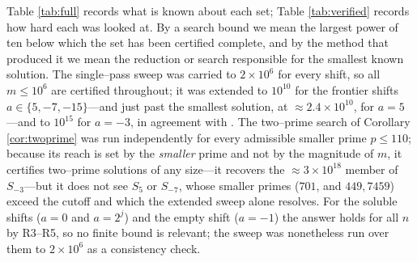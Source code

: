 \documentclass[11pt,reqno]{amsart}
\theoremstyle{plain}
\theoremstyle{definition}
\theoremstyle{remark}
\begin{document}
Table \ref{tab:full} records what is known about each set; Table \ref{tab:verified} records how hard each was looked at. By a search bound we mean the largest power of ten below which the set has been certified complete, and by the method that produced it we mean the reduction or search responsible for the smallest known solution. The single--pass sweep was carried to $2\times10^{6}$ for every shift, so all $m\le10^{6}$ are certified throughout; it was extended to $10^{10}$ for the frontier shifts $a\in\{5,-7,-15\}$---and just past the smallest solution, at $\approx2.4\times10^{10}$, for $a=5$---and to $10^{15}$ for $a=-3$, in agreement with \cite{oeis}. The two--prime search of Corollary \ref{cor:twoprime} was run independently for every admissible smaller prime $p\le110$; because its reach is set by the \emph{smaller} prime and not by the magnitude of $m$, it certifies two--prime solutions of any size---it recovers the $\approx3\times10^{18}$ member of $S_{-3}$---but it does not see $S_5$ or $S_{-7}$, whose smaller primes ($701$, and $449,7459$) exceed the cutoff and which the extended sweep alone resolves. For the soluble shifts ($a=0$ and $a=2^{j}$) and the empty shift ($a=-1$) the answer holds for all $n$ by R3--R5, so no finite bound is relevant; the sweep was nonetheless run over them to $2\times10^{6}$ as a consistency check.
\end{document}
